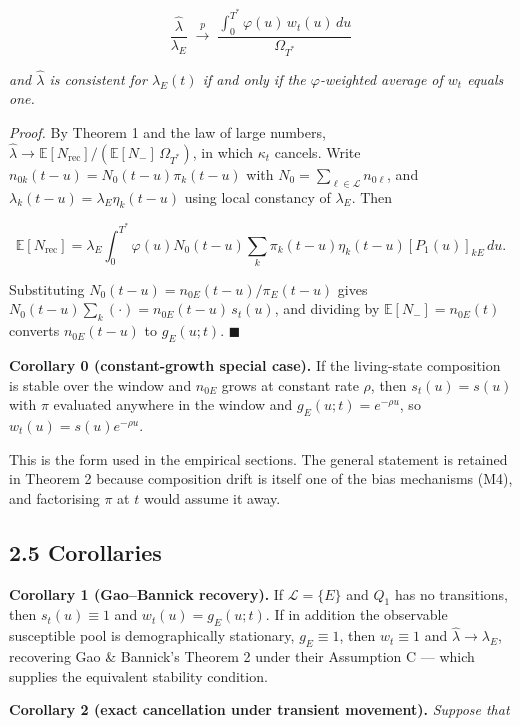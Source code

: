 \[
\boxed{\;
\frac{\hat\lambda}{\lambda_E}
\;\xrightarrow{\;p\;}\;
\frac{\displaystyle\int_0^{T^*}\varphi(u)\,w_t(u)\,du}{\Omega_{T^*}}
\;}
\]

\emph{and \(\hat\lambda\) is consistent for \(\lambda_E(t)\) if and only if the \(\varphi\)-weighted average of \(w_t\) equals one.}

\emph{Proof.} By Theorem 1 and the law of large numbers, \(\hat\lambda \to \mathbb{E}[N_{\mathrm{rec}}]/(\mathbb{E}[N_-]\,\Omega_{T^*})\), in which \(\kappa_t\) cancels. Write \(n_{0k}(t-u)=N_0(t-u)\pi_k(t-u)\) with \(N_0=\sum_{\ell\in\mathcal{L}}n_{0\ell}\), and \(\lambda_k(t-u)=\lambda_E\eta_k(t-u)\) using local constancy of \(\lambda_E\). Then

\[
\mathbb{E}[N_{\mathrm{rec}}]
=\lambda_E\!\int_0^{T^*}\!\!\varphi(u)N_0(t-u)\sum_{k}\pi_k(t-u)\eta_k(t-u)[P_1(u)]_{kE}\,du .
\]

Substituting \(N_0(t-u)=n_{0E}(t-u)/\pi_E(t-u)\) gives \(N_0(t-u)\sum_k(\cdot) = n_{0E}(t-u)\,s_t(u)\), and dividing by \(\mathbb{E}[N_-]=n_{0E}(t)\) converts \(n_{0E}(t-u)\) to \(g_E(u;t)\). \(\blacksquare\)

\textbf{Corollary 0 (constant-growth special case).} If the living-state composition is stable over the window and \(n_{0E}\) grows at constant rate \(\rho\), then \(s_t(u)=s(u)\) with \(\pi\) evaluated anywhere in the window and \(g_E(u;t)=e^{-\rho u}\), so \(w_t(u)=s(u)e^{-\rho u}\).

This is the form used in the empirical sections. The general statement is retained in Theorem 2 because composition drift is itself one of the bias mechanisms (M4), and factorising \(\pi\) at \(t\) would assume it away.

\subsection{2.5 Corollaries}

\textbf{Corollary 1 (Gao--Bannick recovery).} If \(\mathcal{L}=\{E\}\) and \(Q_1\) has no transitions, then \(s_t(u)\equiv1\) and \(w_t(u)=g_E(u;t)\). If in addition the observable susceptible pool is demographically stationary, \(g_E\equiv1\), then \(w_t\equiv1\) and \(\hat\lambda\to\lambda_E\), recovering Gao \& Bannick's Theorem 2 under their Assumption C --- which supplies the equivalent stability condition.

\textbf{Corollary 2 (exact cancellation under transient movement).} \emph{Suppose that}

